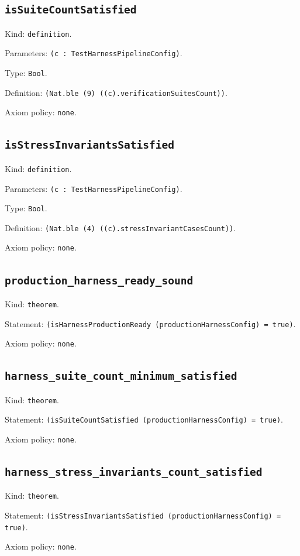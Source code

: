 \documentclass[11pt]{article}
\begin{document}
\subsection*{\texttt{isSuiteCountSatisfied}}
\noindent Kind: \texttt{definition}.\par
\noindent Parameters: \texttt{(c : TestHarnessPipelineConfig)}.\par
\noindent Type: \texttt{Bool}.\par
\noindent Definition: \texttt{(Nat.ble (9) ((c).verificationSuitesCount))}.\par
\noindent Axiom policy: \texttt{none}.\par
\subsection*{\texttt{isStressInvariantsSatisfied}}
\noindent Kind: \texttt{definition}.\par
\noindent Parameters: \texttt{(c : TestHarnessPipelineConfig)}.\par
\noindent Type: \texttt{Bool}.\par
\noindent Definition: \texttt{(Nat.ble (4) ((c).stressInvariantCasesCount))}.\par
\noindent Axiom policy: \texttt{none}.\par
\subsection*{\texttt{production\_harness\_ready\_sound}}
\noindent Kind: \texttt{theorem}.\par
\noindent Statement: \texttt{(isHarnessProductionReady (productionHarnessConfig) = true)}.\par
\noindent Axiom policy: \texttt{none}.\par
\subsection*{\texttt{harness\_suite\_count\_minimum\_satisfied}}
\noindent Kind: \texttt{theorem}.\par
\noindent Statement: \texttt{(isSuiteCountSatisfied (productionHarnessConfig) = true)}.\par
\noindent Axiom policy: \texttt{none}.\par
\subsection*{\texttt{harness\_stress\_invariants\_count\_satisfied}}
\noindent Kind: \texttt{theorem}.\par
\noindent Statement: \texttt{(isStressInvariantsSatisfied (productionHarnessConfig) = true)}.\par
\noindent Axiom policy: \texttt{none}.\par
\end{document}
